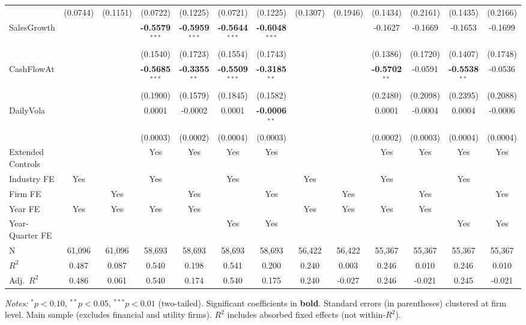 \begin{landscape}
\begin{table}[H]
\begin{tabular}{lcccccccccccc}
 & (0.0744) & (0.1151) & (0.0722) & (0.1225) & (0.0721) & (0.1225) & (0.1307) & (0.1946) & (0.1434) & (0.2161) & (0.1435) & (0.2166) \\
SalesGrowth &  &  & \textbf{-0.5579}$^{***}$ & \textbf{-0.5959}$^{***}$ & \textbf{-0.5644}$^{***}$ & \textbf{-0.6048}$^{***}$ &  &  & -0.1627 & -0.1669 & -0.1653 & -0.1699 \\
 &  &  & (0.1540) & (0.1723) & (0.1554) & (0.1743) &  &  & (0.1386) & (0.1720) & (0.1407) & (0.1748) \\
CashFlowAt &  &  & \textbf{-0.5685}$^{***}$ & \textbf{-0.3355}$^{**}$ & \textbf{-0.5509}$^{***}$ & \textbf{-0.3185}$^{**}$ &  &  & \textbf{-0.5702}$^{**}$ & -0.0591 & \textbf{-0.5538}$^{**}$ & -0.0536 \\
 &  &  & (0.1900) & (0.1579) & (0.1845) & (0.1582) &  &  & (0.2480) & (0.2098) & (0.2395) & (0.2088) \\
DailyVola &  &  & 0.0001 & -0.0002 & 0.0001 & \textbf{-0.0006}$^{**}$ &  &  & 0.0001 & -0.0004 & 0.0004 & -0.0006 \\
 &  &  & (0.0003) & (0.0002) & (0.0004) & (0.0003) &  &  & (0.0002) & (0.0003) & (0.0004) & (0.0004) \\
\midrule
Extended Controls &  &  & Yes & Yes & Yes & Yes &  &  & Yes & Yes & Yes & Yes \\
Industry FE & Yes &  & Yes &  & Yes &  & Yes &  & Yes &  & Yes &  \\
Firm FE &  & Yes &  & Yes &  & Yes &  & Yes &  & Yes &  & Yes \\
Year FE & Yes & Yes & Yes & Yes &  &  & Yes & Yes & Yes & Yes &  &  \\
Year-Quarter FE &  &  &  &  & Yes & Yes &  &  &  &  & Yes & Yes \\
\midrule
N & 61,096 & 61,096 & 58,693 & 58,693 & 58,693 & 58,693 & 56,422 & 56,422 & 55,367 & 55,367 & 55,367 & 55,367 \\
$R^2$ & 0.487 & 0.087 & 0.540 & 0.198 & 0.541 & 0.200 & 0.240 & 0.003 & 0.246 & 0.010 & 0.246 & 0.010 \\
Adj.~$R^2$ & 0.486 & 0.061 & 0.540 & 0.174 & 0.540 & 0.175 & 0.240 & -0.027 & 0.246 & -0.021 & 0.245 & -0.021 \\
\bottomrule
\end{tabular}
\begin{minipage}{\linewidth}
\vspace{2pt}\scriptsize
\textit{Notes:} $^{*}p<0.10$, $^{**}p<0.05$, $^{***}p<0.01$ (two-tailed).
 Significant coefficients in \textbf{bold}.
 Standard errors (in parentheses) clustered at firm level.
 Main sample (excludes financial and utility firms).
 $R^2$ includes absorbed fixed effects (not within-$R^2$).
\end{minipage}
\end{table}
\end{landscape}